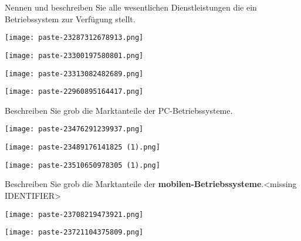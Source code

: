 \documentclass{article}
\begin{document}
\begin{tcolorbox}[colback=white!10!white,colframe=lightgray!75!black,
  savelowerto=\jobname_ex.tex,breakable,enhanced,lines before break=40]

\justifying
Nennen und beschreiben Sie alle wesentlichen Dienstleistungen die ein Betriebssystem zur Verfügung stellt.

\tcblower

\justifying
\begin{center}
\texttt{[image: paste-23287312678913.png]}
\end{center}
\begin{center}
\texttt{[image: paste-23300197580801.png]}
\end{center}
\begin{center}
\texttt{[image: paste-23313082482689.png]}
\end{center}
\begin{center}
\texttt{[image: paste-22960895164417.png]}
\end{center}

\end{tcolorbox}
\begin{tcolorbox}[colback=white!10!white,colframe=lightgray!75!black,
  savelowerto=\jobname_ex.tex,breakable,enhanced,lines before break=40]

\justifying
Beschreiben Sie grob die Marktanteile der PC-Betriebssysteme.

\tcblower

\justifying
\begin{center}
\texttt{[image: paste-23476291239937.png]}
\end{center}
\begin{center}
\texttt{[image: paste-23489176141825 (1).png]}
\end{center}
\begin{center}
\texttt{[image: paste-23510650978305 (1).png]}
\end{center}

\end{tcolorbox}
\begin{tcolorbox}[colback=white!10!white,colframe=lightgray!75!black,
  savelowerto=\jobname_ex.tex,breakable,enhanced,lines before break=40]

\justifying
Beschreiben Sie grob die Marktanteile der \textbf{mobilen-Betriebssysteme}.<missing IDENTIFIER>

\tcblower

\justifying
\begin{center}
\texttt{[image: paste-23708219473921.png]}
\end{center}
\begin{center}
\texttt{[image: paste-23721104375809.png]}
\end{center}

\end{tcolorbox}
\end{document}
